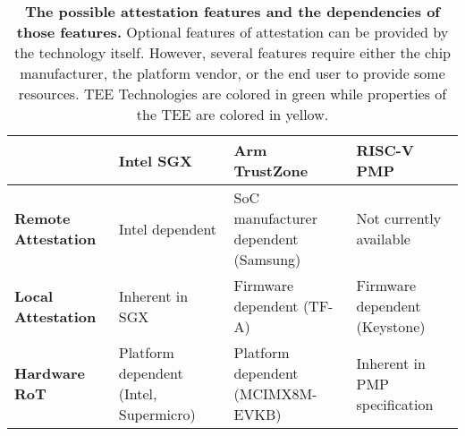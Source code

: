 \begin{table*}[p]
\begin{center}
\begin{tabular}{|l|l|l|l|}
\hline
\textbf{}                                           & \cellcolor{tbl-gre}\textbf{Intel SGX} & \cellcolor{tbl-gre}\textbf{Arm TrustZone} & \cellcolor{tbl-gre}\textbf{RISC-V PMP} \\ \hline
\cellcolor{tbl-yel}\textbf{Remote Attestation} & Intel dependent                            & SoC manufacturer dependent (Samsung)                     & Not currently available                     \\ \hline
\cellcolor{tbl-yel}\textbf{Local Attestation}  & Inherent in SGX                            & Firmware dependent (TF-A)                            & Firmware dependent (Keystone)                          \\ \hline
\cellcolor{tbl-yel}\textbf{Hardware RoT}       & Platform dependent (Intel, Supermicro)                       & Platform dependent  (MCIMX8M-EVKB)                           & Inherent in PMP specification                   \\ \hline
\end{tabular}
\end{center}
\caption[Attestation Comparison]{\textbf{The possible attestation features and the dependencies of those features.} Optional features of attestation can be provided by the technology itself. However, several features require either the chip manufacturer, the platform vendor, or the end user to provide some resources. TEE Technologies are colored in \colorbox{tbl-gre}{green} while properties of the TEE are colored in \colorbox{tbl-yel}{yellow}.}
\label{tab:attest-compare}
\end{table*}

